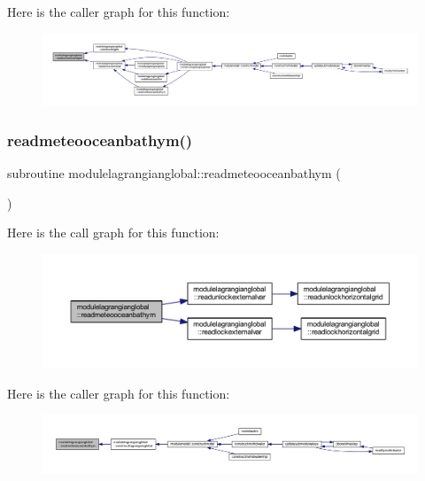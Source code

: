 Here is the caller graph for this function\+:\nopagebreak
\begin{figure}[H]
\begin{center}
\leavevmode
\includegraphics[width=350pt]{namespacemodulelagrangianglobal_adc70a932c70ec9be9f9ebdfe0fe60e08_icgraph}
\end{center}
\end{figure}
\mbox{\label{namespacemodulelagrangianglobal_a46ea20c9e2d71865f07f69618754831d}} 
\subsubsection{\texorpdfstring{readmeteooceanbathym()}{readmeteooceanbathym()}}
{\footnotesize\ttfamily subroutine modulelagrangianglobal\+::readmeteooceanbathym (\begin{DoxyParamCaption}{ }\end{DoxyParamCaption})\hspace{0.3cm}{\ttfamily [private]}}

Here is the call graph for this function\+:\nopagebreak
\begin{figure}[H]
\begin{center}
\leavevmode
\includegraphics[width=350pt]{namespacemodulelagrangianglobal_a46ea20c9e2d71865f07f69618754831d_cgraph}
\end{center}
\end{figure}
Here is the caller graph for this function\+:\nopagebreak
\begin{figure}[H]
\begin{center}
\leavevmode
\includegraphics[width=350pt]{namespacemodulelagrangianglobal_a46ea20c9e2d71865f07f69618754831d_icgraph}
\end{center}
\end{figure}
\mbox{\label{namespacemodulelagrangianglobal_ab2f7aa5d633698c89eab11bcf4c90928}} 
